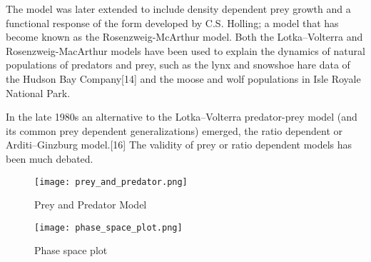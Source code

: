 \documentclass{article}
\begin{document}
The model was later extended to include density dependent prey growth and a functional response of the form developed by C.S. Holling; a model that has become known as the Rosenzweig-McArthur model. Both the Lotka–Volterra and Rosenzweig-MacArthur models have been used to explain the dynamics of natural populations of predators and prey, such as the lynx and snowshoe hare data of the Hudson Bay Company[14] and the moose and wolf populations in Isle Royale National Park.\cite{8}

In the late 1980s an alternative to the Lotka–Volterra predator-prey model (and its common prey dependent generalizations) emerged, the ratio dependent or Arditi–Ginzburg model.[16] The validity of prey or ratio dependent models has been much debated.

\begin{figure}[h]
\begin{center}
\texttt{[image: prey\_and\_predator.png]}
\caption{Prey and Predator Model}
\end{center}
\end{figure}

\begin{figure}[h]
\begin{center}
\texttt{[image: phase\_space\_plot.png]}
\caption{Phase space plot}
\end{center}
\end{figure}

\newpage


\end{document}
